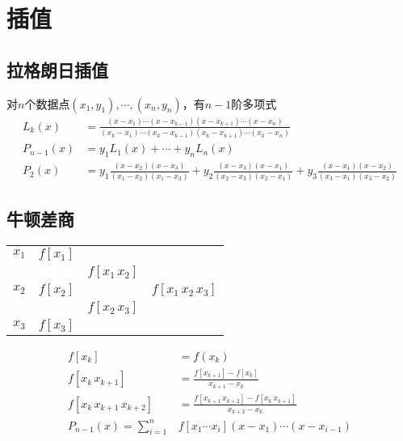 \documentclass[twocolumn]{article}
\begin{document}
\section{插值}

\subsection{拉格朗日插值}
对$n$个数据点$(x_1,y_1),\cdots,(x_n,y_n)$，有$n-1$阶多项式
\begin{align*}
    L_k(x)     & =\frac{(x-x_1)\cdots(x-x_{k-1})(x-x_{k+1})\cdots(x-x_n)}{(x_k-x_1)\cdots(x_k-x_{k-1})(x_k-x_{k+1})\cdots(x_k-x_n)}                      \\
    P_{n-1}(x) & =y_1L_1(x)+\cdots+y_nL_n(x)                                                                                                             \\
    P_2(x)     & =y_1\frac{(x-x_2)(x-x_3)}{(x_1-x_2)(x_1-x_3)}+y_2\frac{(x-x_3)(x-x_1)}{(x_2-x_3)(x_2-x_1)}+y_3\frac{(x-x_1)(x-x_2)}{(x_3-x_1)(x_3-x_2)}
\end{align*}

\subsection{牛顿差商}
\noindent
\begin{minipage}{0.42\linewidth}
    \begin{center}
        \begin{tabular}{c|ccc}
            $x_1$ & $f[x_1]$ &                 &                        \\
                  &          & $f[x_1 \, x_2]$ &                        \\
            $x_2$ & $f[x_2]$ &                 & $f[x_1 \, x_2 \, x_3]$ \\
                  &          & $f[x_2 \, x_3]$ &                        \\
            $x_3$ & $f[x_3]$ &                 &
        \end{tabular}
    \end{center}
\end{minipage}
\begin{minipage}{0.5\linewidth}
    \begin{align*}
        f[x_k]                       & =f(x_k)                                                      \\
        f[x_k \, x_{k+1}]            & =\frac{f[x_{k+1}]-f[x_k]}{x_{k+1}-x_k}                       \\
        f[x_k \, x_{k+1} \, x_{k+2}] & =\frac{f[x_{k+1} \, x_{k+2}]-f[x_k \, x_{k+1}]}{x_{k+2}-x_k} \\
        P_{n-1}(x)=\sum_{i=1}^n      & f[x_1\cdots x_i](x-x_1)\cdots(x-x_{i-1})
    \end{align*}
\end{minipage}
\end{document}
